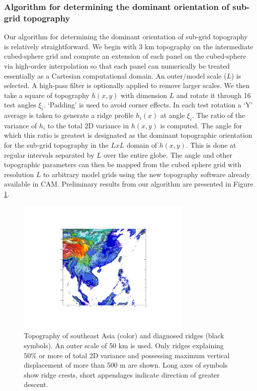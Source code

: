 \documentclass[gmd]{copernicus}
\begin{document}
\subsubsection{Algorithm for determining the dominant orientation of sub-grid topography}\label{sec:sub-orient}
{\color{red}{How to deal with variable resolution grids}}
Our algorithm for determining the dominant orientation of sub-grid topography is relatively straightforward.  We begin with 3 km topography on the intermediate cubed-sphere grid and compute an extension of each panel on the cubed-sphere via high-order interpolation so that each panel can numerically be treated essentially as a Cartesian computational domain. An outer/model scale ($L$) is selected.  A high-pass filter is optionally applied to remove larger scales.  We then take a square of topography $h(x,y)$ with dimension $L$ and rotate it through 16 test angles $\xi_i$.  `Padding' is used to avoid corner effects.  In each test rotation a `Y' average is taken to generate a ridge profile $h_i(x)$ at angle $\xi_i$.  The ratio of the variance of $h_i$ to the total 2D variance in $h(x,y)$ is computed.  The angle for which this ratio is greatest is designated as the dominant topographic orientation for the sub-grid topography in the $LxL$ domain of $h(x,y)$.  This is done at regular intervals separated by $L$ over the entire globe.  The angle and other topographic parameters can then be mapped from the cubed sphere grid with resolution $L$ to arbitrary model grids using the new topography software already available in CAM.  Preliminary results from our algorithm are presented in Figure \ref{fig:dsgso}.
\begin{figure}[tb]
\center\includegraphics[width=20pc,angle=0]{fig/dominant-sub-grid-oro.pdf}
  \caption{Topography of southeast Asia (color) and diagnosed ridges (black symbols). An outer scale of 50 km is used. Only ridges explaining 50\% or more of total 2D variance and possessing maximum vertical displacement of more than 500 m are shown.  Long axes of symbols show ridge crests, short appendages indicate direction of greater descent.}\label{fig:dsgso}
\end{figure} 
\end{document}
